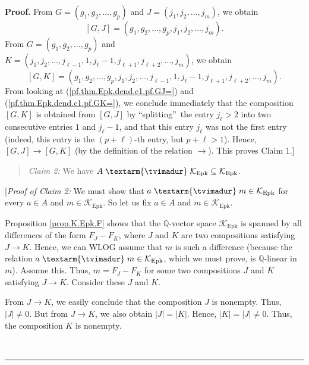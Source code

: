 \documentclass[numbers=enddot,12pt,final,onecolumn,notitlepage]{scrartcl}%
\theoremstyle{definition}
\newenvironment{statement}{\begin{quote}}{\end{quote}}
\newenvironment{proof}[1][Proof]{\noindent\textbf{#1.} }{\ \rule{0.5em}{0.5em}}
\newenvironment{verlong}{}{}
\newcommand{\tvi}{\left. \textarm{\tvimadur} \right.}
\begin{document}
\begin{verlong}
\begin{proof}
From $G=\left(  g_{1},g_{2},\ldots,g_{p}\right)  $ and $J=\left(  j_{1}%
,j_{2},\ldots,j_{m}\right)  $, we obtain%
\begin{equation}
\left[  G,J\right]  =\left(  g_{1},g_{2},\ldots,g_{p},j_{1},j_{2},\ldots
,j_{m}\right)  . \label{pf.thm.Epk.dend.c1.pf.GJ=}%
\end{equation}
From $G=\left(  g_{1},g_{2},\ldots,g_{p}\right)  $ and $K=\left(  j_{1}%
,j_{2},\ldots,j_{\ell-1},1,j_{\ell}-1,j_{\ell+1},j_{\ell+2},\ldots
,j_{m}\right)  $, we obtain%
\begin{equation}
\left[  G,K\right]  =\left(  g_{1},g_{2},\ldots,g_{p},j_{1},j_{2}%
,\ldots,j_{\ell-1},1,j_{\ell}-1,j_{\ell+1},j_{\ell+2},\ldots,j_{m}\right)  .
\label{pf.thm.Epk.dend.c1.pf.GK=}%
\end{equation}
From looking at (\ref{pf.thm.Epk.dend.c1.pf.GJ=}) and
(\ref{pf.thm.Epk.dend.c1.pf.GK=}), we conclude immediately that the
composition $\left[  G,K\right]  $ is obtained from $\left[  G,J\right]  $ by
\textquotedblleft splitting\textquotedblright\ the entry $j_{\ell}>2$ into two
consecutive entries $1$ and $j_{\ell}-1$, and that this entry $j_{\ell}$ was
not the first entry (indeed, this entry is the $\left(  p+\ell\right)  $-th
entry, but $p+\ell>1$). Hence, $\left[  G,J\right]  \rightarrow\left[
G,K\right]  $ (by the definition of the relation $\rightarrow$). This proves
Claim 1.]

\begin{statement}
\textit{Claim 2:} We have $A\tvi  \mathcal{K}_{\operatorname*{Epk}}%
\subseteq\mathcal{K}_{\operatorname*{Epk}}$.
\end{statement}

[\textit{Proof of Claim 2:} We must show that $a\tvi  m\in\mathcal{K}%
_{\operatorname*{Epk}}$ for every $a\in A$ and $m\in\mathcal{K}%
_{\operatorname*{Epk}}$. So let us fix $a\in A$ and $m\in\mathcal{K}%
_{\operatorname*{Epk}}$.

Proposition \ref{prop.K.Epk.F} shows that the $\mathbb{Q}$-vector space
$\mathcal{K}_{\operatorname*{Epk}}$ is spanned by all differences of the form
$F_{J}-F_{K}$, where $J$ and $K$ are two compositions satisfying $J\rightarrow
K$. Hence, we can WLOG assume that $m$ is such a difference (because the
relation $a\tvi  m\in\mathcal{K}_{\operatorname*{Epk}}$, which we must prove,
is $\mathbb{Q}$-linear in $m$). Assume this. Thus, $m=F_{J}-F_{K}$ for some
two compositions $J$ and $K$ satisfying $J\rightarrow K$. Consider these $J$
and $K$.

From $J\rightarrow K$, we easily conclude that the composition $J$ is
nonempty. Thus, $\left\vert J\right\vert \neq0$. But from $J\rightarrow K$, we
also obtain $\left\vert J\right\vert =\left\vert K\right\vert $. Hence,
$\left\vert K\right\vert =\left\vert J\right\vert \neq0$. Thus, the
composition $K$ is nonempty.


\end{proof}
\end{verlong}
\end{document}
